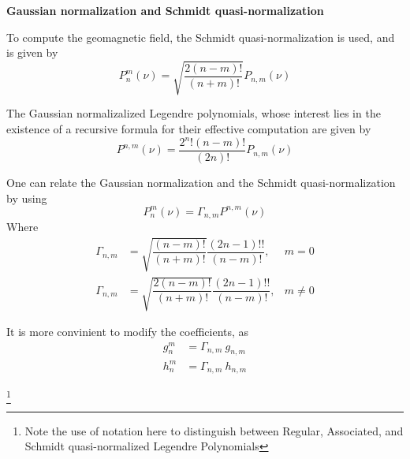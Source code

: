 {\bf Gaussian normalization and Schmidt quasi-normalization}

To compute the geomagnetic field, the Schmidt quasi-normalization is used, and is given by
\begin{equation}
P_n^m(\nu) = \sqrt{\dfrac{2(n-m)!}{(n+m)!}} P_{n,m}(\nu) 
\end{equation}

The Gaussian normalizalized Legendre polynomials, whose interest lies in the existence of a recursive formula for their effective computation are given by
\begin{equation}
P^{n,m}(\nu) = \dfrac{2^n! (n-m)!}{(2n)!} P_{n,m}(\nu)
\end{equation}

One can relate the Gaussian normalization and the Schmidt quasi-normalization by using
\begin{equation}
P_n^m(\nu) = \Gamma_{n,m} P^{n,m}(\nu)
\end{equation}
Where
\begin{equation}
\begin{aligned}
\Gamma_{n,m} &= \sqrt{\dfrac{(n-m)!}{(n+m)!}}\dfrac{(2n-1)!!}{(n-m)!}, &m = 0\\
\Gamma_{n,m} &= \sqrt{\dfrac{2(n-m)!}{(n+m)!}}\dfrac{(2n-1)!!}{(n-m)!}, &m \neq 0
\end{aligned}
\end{equation}

It is more convinient to modify the coefficients, as
\begin{equation}
\begin{aligned}
g_n^m &= \Gamma_{n,m}\ g_{n,m}\\ h_n^m &= \Gamma_{n,m}\ h_{n,m}
\end{aligned}
\end{equation}


\footnote{Note the use of notation here to distinguish between Regular, Associated, and Schmidt quasi-normalized Legendre Polynomials}

